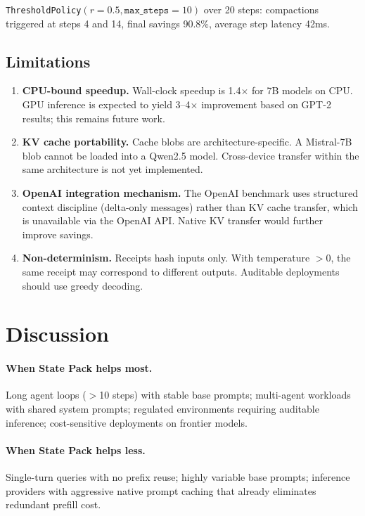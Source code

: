 \documentclass[11pt,a4paper]{article}
\begin{document}
\texttt{ThresholdPolicy}$(r{=}0.5, \texttt{max\_steps}{=}10)$ over 20 steps:
compactions triggered at steps 4 and 14, final savings 90.8\%,
average step latency 42ms.

\subsection{Limitations}

\begin{enumerate}
  \item \textbf{CPU-bound speedup.} Wall-clock speedup is 1.4$\times$ for 7B
        models on CPU. GPU inference is expected to yield 3--4$\times$
        improvement based on GPT-2 results; this remains future work.
  \item \textbf{KV cache portability.} Cache blobs are architecture-specific.
        A Mistral-7B blob cannot be loaded into a Qwen2.5 model.
        Cross-device transfer within the same architecture is not yet
        implemented.
  \item \textbf{OpenAI integration mechanism.} The OpenAI benchmark uses
        structured context discipline (delta-only messages) rather than
        KV cache transfer, which is unavailable via the OpenAI API.
        Native KV transfer would further improve savings.
  \item \textbf{Non-determinism.} Receipts hash inputs only. With
        temperature $> 0$, the same receipt may correspond to different
        outputs. Auditable deployments should use greedy decoding.
\end{enumerate}

\section{Discussion}
\label{sec:discussion}

\paragraph{When State Pack helps most.}
Long agent loops ($>$10 steps) with stable base prompts; multi-agent
workloads with shared system prompts; regulated environments requiring
auditable inference; cost-sensitive deployments on frontier models.

\paragraph{When State Pack helps less.}
Single-turn queries with no prefix reuse; highly variable base prompts;
inference providers with aggressive native prompt caching that already
eliminates redundant prefill cost.
\end{document}
